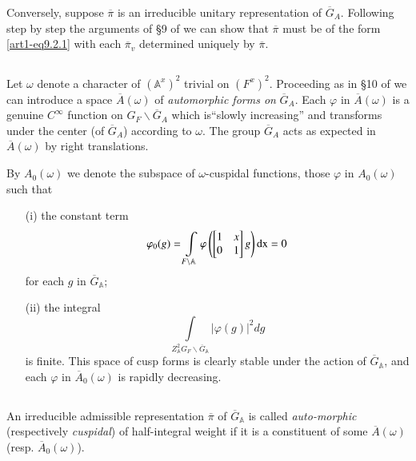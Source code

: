 Conversely, suppose $\overline{\pi}$ is an irreducible unitary representation of $\overline{G}_{A}$. Following step by step the arguments of \S9 of \cite{Jacquet-Langlands} we can show that $\overline{\pi}$ must be of the form \eqref{art1-eq9.2.1} with each $\overline{\pi}_{v}$ determined uniquely by $\overline{\pi}$.

\subsection{}\label{art1-sec9.3}
Let $\omega$ denote a character of $(\mathbb{A}^{x})^{2}$ trivial on $(F^{x})^{2}$. Proceeding as in \S10 of \cite{Jacquet-Langlands} we can introduce a space $\overline{A}(\omega)$ of {\em automorphic forms on} $\overline{G}_{A}$. Each $\varphi$ in $\overline{A}(\omega)$ is a genuine $C^{\infty}$ function on $G_{F}\backslash \overline{G}_{A}$ which is\pageoriginale ``slowly increasing'' and transforms under the center (of $\overline{G}_{A}$) according to $\omega$. The group $\overline{G}_{A}$ acts as expected in $\overline{A}(\omega)$ by right translations.

By $A_{0}(\omega)$ we denote the subspace of $\omega$-cuspidal functions, those $\varphi$ in $A_{0}(\omega)$ such that
\begin{itemize}
\item[(i)] the constant term
$$
\varphi_{0}(g)=\int\limits_{F\backslash \mathbb{A}}\varphi\left(\begin{bmatrix} 1 & x\\ 0 & 1\end{bmatrix}g\right)\mathrm{dx}=0
$$
for each $g$ in $\overline{G}_{\mathbb{A}}$;

\item[(ii)] the integral
$$
\int\limits_{Z^{2}_{\mathbb{A}}G_{F}\backslash \overline{G}_{\mathbb{A}}}|\varphi(g)|^{2}dg
$$
is finite. This space of cusp forms is clearly stable under the action of $\overline{G}_{\mathbb{A}}$, and each $\varphi$ in $\overline{A}_{0}(\omega)$ is rapidly decreasing.
\end{itemize}

\subsection{}\label{art1-sec9.4}
An irreducible admissible representation $\overline{\pi}$ of $\overline{G}_{\mathbb{A}}$ is called {\em auto-morphic} (respectively {\em cuspidal}) of half-integral weight if it is a constituent of some $\overline{A}(\omega)$ (resp. $\overline{A}_{0}(\omega)$).

